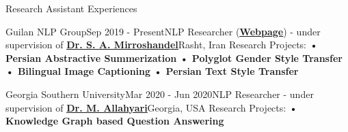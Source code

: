 \documentclass{resume} %
\begin{document}



\begin{rSection}{Research Assistant Experiences}

\begin{rSubsection}{Guilan NLP Group}{Sep 2019 - Present}{NLP Researcher (\textbf{\underline{\href{https://nlp.guilan.ac.ir/people}{Webpage}}}) -  \normalfont under supervision of \textbf{\underline{\href{https://nlp.guilan.ac.ir/mirroshandel/}{Dr. S. A. Mirroshandel}}}}{Rasht, Iran}
Research Projects: \quad\textbf{• Persian Abstractive Summerization} \quad \textbf{• Polyglot Gender Style Transfer} \quad \textbf{• Bilingual Image Captioning} \quad \textbf{• Persian Text Style Transfer}  
\end{rSubsection}

\begin{rSubsection}{Georgia Southern University}{Mar 2020 - Jun 2020}{NLP Researcher - \normalfont under supervision of \textbf{\underline{\href{https://sci2lab.github.io/mehdi/}{Dr. M. Allahyari}}}}{Georgia, USA}
Research Projects:  \quad\textbf{• Knowledge Graph based Question Answering} 
\end{rSubsection}
\end{rSection}
\end{document}
